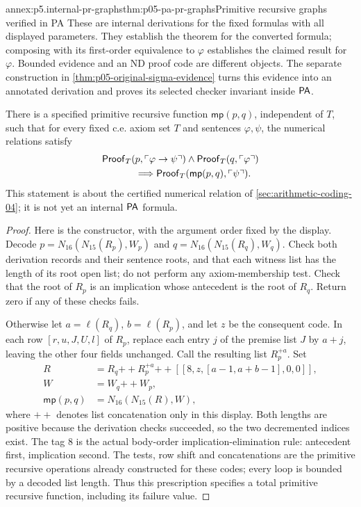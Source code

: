 \begin{annexitem}{annex:p5.internal-pr-graphs}{thm:p05-pa-pr-graphs}{Primitive recursive graphs verified in PA}
These are internal derivations for the fixed formulas with all displayed
parameters.  They establish the theorem for the converted formula; composing
with its first-order equivalence to \(\varphi\) establishes the claimed
result for \(\varphi\). Bounded evidence and an ND proof code are
different objects. The separate construction in
\cref{thm:p05-original-sigma-evidence} turns this evidence into an annotated
derivation and proves its selected checker invariant inside \(\mathsf{PA}\).

\begin{annexlemma}
\label{lem:p05-numerical-mp-constructor}
There is a specified primitive recursive function \(\mathsf{mp}(p,q)\),
independent of \(T\), such that for every fixed c.e. axiom set \(T\)
and sentences \(\varphi,\psi\), the numerical relations satisfy
\[
\begin{split}
 &\mathsf{Proof}_T(p,\ulcorner\varphi\to\psi\urcorner)
       \land\mathsf{Proof}_T(q,\ulcorner\varphi\urcorner)\\
 &\hspace{12mm}\Longrightarrow
       \mathsf{Proof}_T(\mathsf{mp}(p,q),\ulcorner\psi\urcorner).
\end{split}
\]
This statement is about the certified numerical relation of
\cref{sec:arithmetic-coding-04}; it is not yet an internal \(\mathsf{PA}\) formula.
\end{annexlemma}
\begin{proof}
Here is the constructor, with the argument order fixed by the display.
Decode \(p=N_{16}(N_{15}(R_p),W_p)\) and
\(q=N_{16}(N_{15}(R_q),W_q)\).  Check both derivation records and their
sentence roots, and that each witness list has the length of its root open
list; do not perform any axiom-membership test.  Check that the root of
\(R_p\) is an implication whose antecedent is the root of \(R_q\).
Return zero if any of these checks fails.

Otherwise let \(a=\ell(R_q)\), \(b=\ell(R_p)\), and let \(z\)
be the consequent code.  In each row \([r,u,J,U,l]\) of \(R_p\),
replace each entry \(j\) of the premise list \(J\) by \(a+j\),
leaving the other four fields unchanged.  Call the resulting list
\(R_p^{+a}\).  Set
\[
\begin{aligned}
 R&=R_q\mathbin{+\!+}R_p^{+a}\mathbin{+\!+}
          [[8,z,[a-1,a+b-1],0,0]],\\
 W&=W_q\mathbin{+\!+}W_p,\\
 \mathsf{mp}(p,q)&=N_{16}(N_{15}(R),W),
\end{aligned}
\]
where \(+\!+\) denotes list concatenation only in this display.
Both lengths are positive because the derivation checks succeeded, so the
two decremented indices exist.  The tag \(8\) is the actual body-order
implication-elimination rule: antecedent first, implication second.
The tests, row shift and concatenations are the primitive recursive
operations already constructed for these codes; every loop is bounded by a
decoded list length.  Thus this prescription specifies a total primitive
recursive function, including its failure value.


\end{proof}
\end{annexitem}
